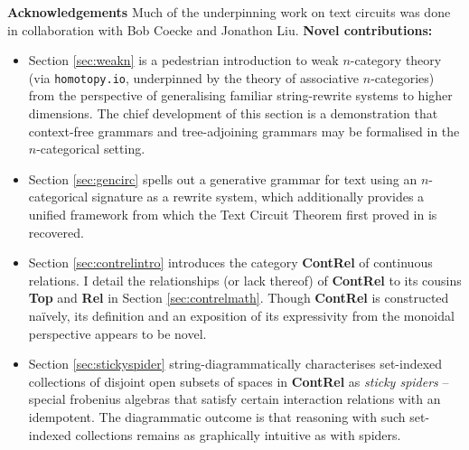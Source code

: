 


\thispagestyle{empty}%
\maketitle%


\tableofcontents{}

\clearpage
\newpage
\vfill
\begin{myboxB}
\centering
\textbf{Acknowledgements}
Much of the underpinning work on text circuits was done in collaboration with Bob Coecke and Jonathon Liu.
\textbf{Novel contributions:}
\begin{itemize}

\item Section \ref{sec:weakn} is a pedestrian introduction to weak $n$-category theory (via \texttt{homotopy.io}, underpinned by the theory of associative $n$-categories) from the perspective of generalising familiar string-rewrite systems to higher dimensions. The chief development of this section is a demonstration that context-free grammars and tree-adjoining grammars may be formalised in the $n$-categorical setting.

\item Section \ref{sec:gencirc} spells out a generative grammar for text using an $n$-categorical signature as a rewrite system, which additionally provides a unified framework from which the Text Circuit Theorem first proved in \citep{wang-mascianica_distilling_2023} is recovered.

\item Section \ref{sec:contrelintro} introduces the category \textbf{ContRel} of continuous relations. I detail the relationships (or lack thereof) of \textbf{ContRel} to its cousins \textbf{Top} and \textbf{Rel} in Section \ref{sec:contrelmath}. Though \textbf{ContRel} is constructed na\"{i}vely, its definition and an exposition of its expressivity from the monoidal perspective appears to be novel.

\item Section \ref{sec:stickyspider} string-diagrammatically characterises set-indexed collections of disjoint open subsets of spaces in \textbf{ContRel} as \emph{sticky spiders} -- special frobenius algebras that satisfy certain interaction relations with an idempotent. The diagrammatic outcome is that reasoning with such set-indexed collections remains as graphically intuitive as with spiders.


\end{itemize}
\end{myboxB}
